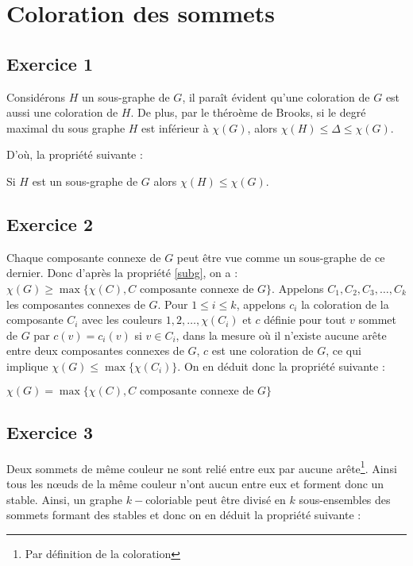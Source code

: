 \section{Coloration des sommets}

\subsection{Exercice 1}

Considérons $H$ un sous-graphe de $G$, il paraît évident qu'une coloration de $G$ est aussi une
coloration de $H$. De plus, par le théroème de Brooks, si le degré maximal du sous graphe $H$ est
inférieur à $\chi(G)$, alors $\chi(H) \leq \Delta \leq \chi(G)$.

D'où, la propriété suivante :

\begin{prop}
	\label{subg}
	Si $H$ est un sous-graphe de $G$ alors $\chi(H) \leq \chi(G)$.
\end{prop}

\subsection{Exercice 2}

Chaque composante connexe de $G$ peut être vue comme un sous-graphe de ce dernier. Donc d'après la
propriété \ref{subg}, on a : $\chi(G) \geq \max\{\chi(C), C\mbox{ composante connexe de }G\}$.
Appelons $C_1, C_2, C_3, \dots, C_k$ les composantes connexes de $G$. Pour $1 \leq i \leq k$,
appelons $c_i$ la coloration de la composante $C_i$ avec les couleurs $1, 2, \dots, \chi(C_i)$ et
$c$ définie pour tout $v$ sommet de $G$ par $c(v) = c_i(v)$ si $v \in C_i$, dans la mesure où il
n'existe aucune arête entre deux composantes connexes de $G$, $c$ est une coloration de $G$, ce qui
implique $\chi(G) \leq \max\{\chi(C_i)\}$. On en déduit donc la propriété suivante :

\begin{prop}
	\label{maxcon}
	$\chi(G) = \max\{\chi(C), C \mbox{ composante connexe de }G\}$
\end{prop}

\subsection{Exercice 3}

Deux sommets de même couleur ne sont relié entre eux par aucune arête\footnote{Par définition de la
coloration}. Ainsi tous les n\oe uds de la même couleur n'ont aucun entre eux et forment donc un
stable. Ainsi, un graphe $k-$coloriable peut être divisé en $k$ sous-ensembles des sommets formant
des stables et donc on en déduit la propriété suivante :


